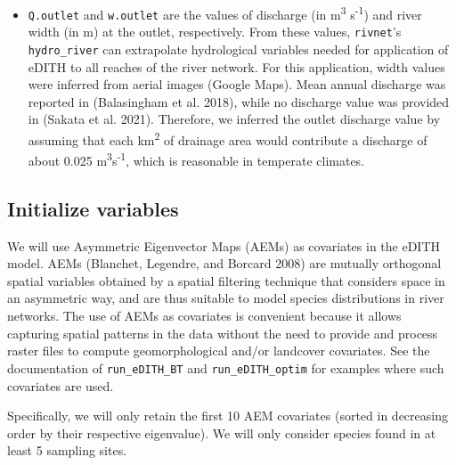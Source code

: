 \documentclass[
]{article}
\begin{document}
\begin{itemize}
\item
  \texttt{Q.outlet} and \texttt{w.outlet} are the values of discharge (in m\textsuperscript{3} s\textsuperscript{-1}) and river width (in m) at the outlet, respectively. From these values, \texttt{rivnet}'s \texttt{hydro\_river} can extrapolate hydrological variables needed for application of eDITH to all reaches of the river network. For this application, width values were inferred from aerial images (Google Maps). Mean annual discharge was reported in (Balasingham et al. 2018), while no discharge value was provided in (Sakata et al. 2021). Therefore, we inferred the outlet discharge value by assuming that each km\textsuperscript{2} of drainage area would contribute a discharge of about 0.025 m\textsuperscript{3}s\textsuperscript{-1}, which is reasonable in temperate climates.
\end{itemize}

\hypertarget{initialize-variables}{%
\subsection{Initialize variables}\label{initialize-variables}}

We will use Asymmetric Eigenvector Maps (AEMs) as covariates in the eDITH model. AEMs (Blanchet, Legendre, and Borcard 2008) are mutually orthogonal spatial variables obtained by a spatial filtering technique that considers space in an asymmetric way, and are thus suitable to model species distributions in river networks. The use of AEMs as covariates is convenient because it allows capturing spatial patterns in the data without the need to provide and process raster files to compute geomorphological and/or landcover covariates. See the documentation of \texttt{run\_eDITH\_BT} and \texttt{run\_eDITH\_optim} for examples where such covariates are used.

Specifically, we will only retain the first 10 AEM covariates (sorted in decreasing order by their respective eigenvalue). We will only consider species found in at least 5 sampling sites.
\end{document}
